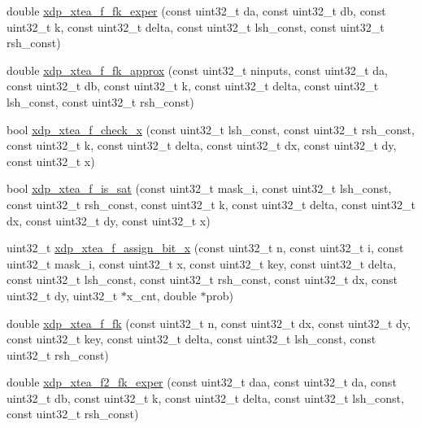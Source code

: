 \begin{DoxyCompactItemize}
\item 
double \hyperlink{xdp-xtea-f-fk_8hh_a018d08ae7ff25abdcd37390243db1eb0}{xdp\-\_\-xtea\-\_\-f\-\_\-fk\-\_\-exper} (const uint32\-\_\-t da, const uint32\-\_\-t db, const uint32\-\_\-t k, const uint32\-\_\-t delta, const uint32\-\_\-t lsh\-\_\-const, const uint32\-\_\-t rsh\-\_\-const)
\item 
double \hyperlink{xdp-xtea-f-fk_8hh_ad0e35d7ca06473517c130c7b65a25b12}{xdp\-\_\-xtea\-\_\-f\-\_\-fk\-\_\-approx} (const uint32\-\_\-t ninputs, const uint32\-\_\-t da, const uint32\-\_\-t db, const uint32\-\_\-t k, const uint32\-\_\-t delta, const uint32\-\_\-t lsh\-\_\-const, const uint32\-\_\-t rsh\-\_\-const)
\item 
bool \hyperlink{xdp-xtea-f-fk_8hh_a6e69cef9b0ca14ea6b1f9b04b4881d1d}{xdp\-\_\-xtea\-\_\-f\-\_\-check\-\_\-x} (const uint32\-\_\-t lsh\-\_\-const, const uint32\-\_\-t rsh\-\_\-const, const uint32\-\_\-t k, const uint32\-\_\-t delta, const uint32\-\_\-t dx, const uint32\-\_\-t dy, const uint32\-\_\-t x)
\item 
bool \hyperlink{xdp-xtea-f-fk_8hh_a905c7d81037abb43273874ee21fcb871}{xdp\-\_\-xtea\-\_\-f\-\_\-is\-\_\-sat} (const uint32\-\_\-t mask\-\_\-i, const uint32\-\_\-t lsh\-\_\-const, const uint32\-\_\-t rsh\-\_\-const, const uint32\-\_\-t k, const uint32\-\_\-t delta, const uint32\-\_\-t dx, const uint32\-\_\-t dy, const uint32\-\_\-t x)
\item 
uint32\-\_\-t \hyperlink{xdp-xtea-f-fk_8hh_ac13f0ebeaefa51e754dc2f30ff6739e3}{xdp\-\_\-xtea\-\_\-f\-\_\-assign\-\_\-bit\-\_\-x} (const uint32\-\_\-t n, const uint32\-\_\-t i, const uint32\-\_\-t mask\-\_\-i, const uint32\-\_\-t x, const uint32\-\_\-t key, const uint32\-\_\-t delta, const uint32\-\_\-t lsh\-\_\-const, const uint32\-\_\-t rsh\-\_\-const, const uint32\-\_\-t dx, const uint32\-\_\-t dy, uint32\-\_\-t $\ast$x\-\_\-cnt, double $\ast$prob)
\item 
double \hyperlink{xdp-xtea-f-fk_8hh_a7c1689f4a0dacf2da163606aca381980}{xdp\-\_\-xtea\-\_\-f\-\_\-fk} (const uint32\-\_\-t n, const uint32\-\_\-t dx, const uint32\-\_\-t dy, const uint32\-\_\-t key, const uint32\-\_\-t delta, const uint32\-\_\-t lsh\-\_\-const, const uint32\-\_\-t rsh\-\_\-const)
\item 
double \hyperlink{xdp-xtea-f-fk_8hh_ae3c35b55368977a2cdafb55b0498ac85}{xdp\-\_\-xtea\-\_\-f2\-\_\-fk\-\_\-exper} (const uint32\-\_\-t daa, const uint32\-\_\-t da, const uint32\-\_\-t db, const uint32\-\_\-t k, const uint32\-\_\-t delta, const uint32\-\_\-t lsh\-\_\-const, const uint32\-\_\-t rsh\-\_\-const)

\end{DoxyCompactItemize}

